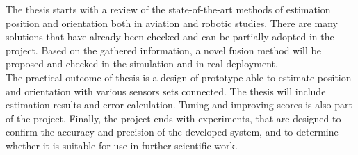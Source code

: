 The thesis starts with a review of the state-of-the-art methods of estimation position and orientation both in aviation and robotic studies. There are many solutions that have already been checked and can be partially adopted in the project. Based on the gathered information, a novel fusion method will be proposed and checked in the simulation and in real deployment.\\

The practical outcome of thesis is a design of prototype able to estimate position and orientation with various sensors sets connected. The thesis will include estimation results and error calculation. Tuning and improving scores is also part of the project. Finally, the project ends with experiments, that are designed to confirm the accuracy and precision of the developed system, and to determine whether it is suitable for use in further scientific work. 